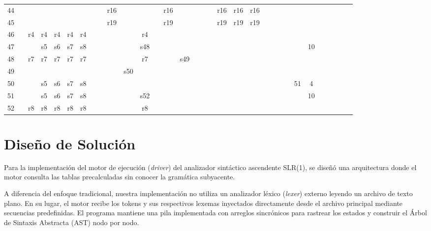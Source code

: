 \documentclass[12pt, letterpaper]{article}
\begin{document}
\begin{landscape}
\begin{longtable}{|c|*{23}{c|}*{8}{c|}}
44 & & & & & & & & & r16 & & & & r16 & & & & & r16 & r16 & r16 & & & & & & & & & & & \\
45 & & & & & & & & & r19 & & & & r19 & & & & & r19 & r19 & r19 & & & & & & & & & & & \\
46 & & r4 & r4 & r4 & r4 & r4 & & & & & r4 & & & & & & & & & & & & & & & & & & & & \\
47 & & & s5 & s6 & s7 & s8 & & & & & s48 & & & & & & & & & & & & & & & 10 & & & & & \\
48 & & r7 & r7 & r7 & r7 & r7 & & & & & r7 & & & s49 & & & & & & & & & & & & & & & & & \\
49 & & & & & & & & & & s50 & & & & & & & & & & & & & & & & & & & & & \\
50 & & & s5 & s6 & s7 & s8 & & & & & & & & & & & & & & & & & & & 51 & 4 & & & & & \\
51 & & & s5 & s6 & s7 & s8 & & & & & s52 & & & & & & & & & & & & & & & 10 & & & & & \\
52 & & r8 & r8 & r8 & r8 & r8 & & & & & r8 & & & & & & & & & & & & & & & & & & & & \\
\hline
\end{longtable}
\endgroup
\end{landscape}

\section{Diseño de Solución}

Para la implementación del motor de ejecución (\textit{driver}) del analizador sintáctico ascendente SLR(1), se diseñó una arquitectura donde el motor consulta las tablas precalculadas sin conocer la gramática subyacente. 

A diferencia del enfoque tradicional, nuestra implementación no utiliza un analizador léxico (\textit{lexer}) externo leyendo un archivo de texto plano. En su lugar, el motor recibe los tokens y sus respectivos lexemas inyectados directamente desde el archivo principal mediante secuencias predefinidas. El programa mantiene una pila implementada con arreglos sincrónicos para rastrear los estados y construir el Árbol de Sintaxis Abstracta (AST) nodo por nodo.
\end{document}
